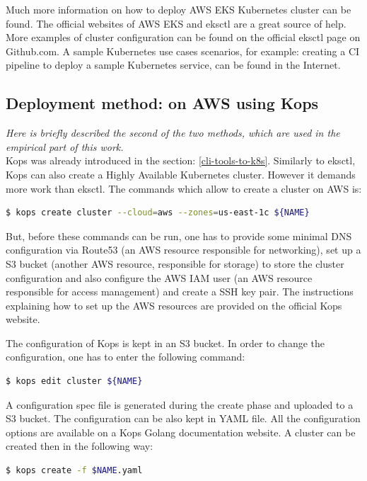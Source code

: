 Much more information on how to deploy AWS EKS Kubernetes cluster can be found. The official websites of AWS EKS\cite{what-is-eks} and eksctl\cite{eksctl} are a great source of help. More examples of cluster configuration can be found on the official eksctl page on Github.com\cite{eks-gh}. A sample Kubernetes use cases scenarios, for example: creating a CI pipeline to deploy a sample Kubernetes service, can be found in the Internet\cite{eksworkshop}.


\subsection{Deployment method: on AWS using Kops}
\textit{Here is briefly described the second of the two methods, which are used in the empirical part of this work.}
\\

Kops was already introduced in the section: \ref{cli-tools-to-k8s}. Similarly to eksctl, Kops can also create a Highly Available Kubernetes cluster. However it demands more work than eksctl. The commands which allow to create a cluster on AWS is\cite{book-mastering-k8s}:
\begin{lstlisting}[basicstyle=\small,caption={The commands of Kops CLI tool used to create a Kubernetes cluster},captionpos=b,language=Bash,xleftmargin=1cm]
$ kops create cluster --cloud=aws --zones=us-east-1c ${NAME}
\end{lstlisting}
But, before these commands can be run, one has to provide some minimal DNS configuration via Route53 (an AWS resource responsible for networking), set up a S3 bucket (another AWS resource, responsible for storage) to store the cluster configuration\cite{book-mastering-k8s} and also configure the AWS IAM user (an AWS resource responsible for access management) and create a SSH key pair\cite{online-kops-aws}. The instructions explaining how to set up the AWS resources are provided on the official Kops website\cite{online-kops-aws}.

The configuration of Kops is kept in an S3 bucket. In order to change the configuration, one has to enter the following command\cite{online-kops-aws}:
\begin{lstlisting}[basicstyle=\small,caption={A command of Kops CLI tool used to edit a Kubernetes cluster configuration},captionpos=b,language=Bash,xleftmargin=1cm]
$ kops edit cluster ${NAME}
\end{lstlisting}

A configuration spec file is generated during the create phase and uploaded to a S3 bucket. The configuration can be also kept in YAML file. All the configuration options are available on a Kops Golang documentation website\cite{online-kops-yaml-config-golang}. A cluster can be created then in the following way\cite{online-kops-yaml-config}:
\begin{lstlisting}[basicstyle=\small,caption={A command of Kops CLI tool used to create a Kubernetes cluster using a YAML configuration file},captionpos=b,language=Bash,xleftmargin=1cm]
$ kops create -f $NAME.yaml
\end{lstlisting}


